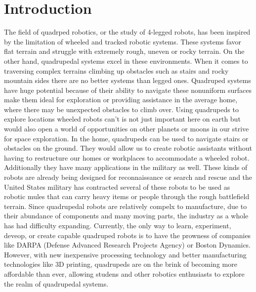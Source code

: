 \graphicspath{ {./figures/} }
\section{Introduction} \label{chap:Introduction}


    The field of quadrped robotics, or the study of 4-legged robots, has been inspired by the limitation of wheeled and tracked robotic systems. These systems favor flat terrain and struggle with extremely rough, uneven or rocky terrain. On the other hand, quadrupedal systems excel in these environments. When it comes to traversing complex terrains climbing up obstacles such as stairs and rocky mountain sides there are no better systems than legged ones. Quadruped systems have huge potential because of their ability to navigate these nonuniform surfaces make them ideal for exploration or providing assistance in the average home, where there may be unexpected obstacles to climb over. Using quadrupeds to explore locations wheeled robots can't is not just important here on earth but would also open a world of opportunities on other planets or moons in our strive for space exploration. In the home, quadrupeds can be used to navigate stairs or obstacles on the ground. They would allow us to create robotic assistants without having to restructure our homes or workplaces to accommodate a wheeled robot. Additionally they have many applications in the military as well. These kinds of robots are already being designed for reconnaissance or search and rescue and the United States military has contracted several of these robots to be used as robotic mules that can carry heavy items or people through the rough battlefield terrain. Since quadrupedal robots are relatively compelx to manufacture, due to their abundance of components and many moving parts, the industry as a whole has had difficulty expanding. Currently, the only way to learn, experiment, deveop, or create capable quadruped robots is to have the prowness of companies like DARPA (Defense Advanced Research Projects Agency) or Boston Dynamics. However, with new inexpensive processing technology and better manufacturing technologies like 3D printing, quadrupeds are on the brink of becoming more affordable than ever, allowing studens and other robotics enthusiasts to explore the realm of quadrupedal systems.

